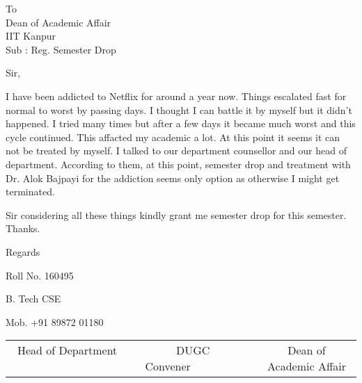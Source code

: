\documentclass{letter}
\begin{document}
{\ttfamily
\begin{letter}{To\\ Dean of Academic Affair\\ IIT Kanpur\\ Sub : Reg. Semester Drop }
\vspace{2em}
\opening{Sir,}
I have been addicted to Netflix for around a year now. Things escalated fast for normal to worst by passing days. I thought I can battle it by myself but it didn't happened. I tried many times but after a few days it became much worst and this cycle continued. This affacted my academic a lot. At this point it seems it can not be treated by myself. I talked to our department counsellor and our head of department. According to them, at this point, semester drop and treatment with Dr. Alok Bajpayi for the addiction seems only option as  otherwise I might get terminated. \par Sir considering all these things kindly grant me semester drop for this semester. Thanks.
\closing{Regards}
Roll No. 160495 \par 
B. Tech CSE\par 
Mob. +91 89872 01180\par 
\vspace{10em}
\begin{tabular}{c c c}
Head of Department ~~~~~~~~~& DUGC Convener~~~~~~~~~ & Dean of Academic Affair

\end{tabular}
\end{letter}}
\end{document}
